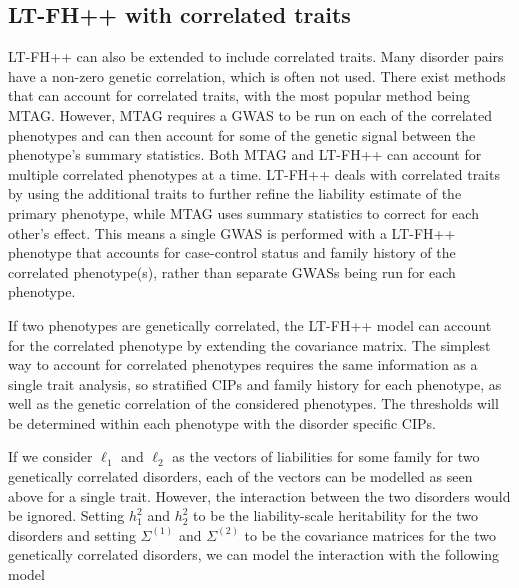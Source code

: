 \subsection{LT-FH++ with correlated traits} \label{sec:methods:ltfhpp:correlatedTraits}
LT-FH++ can also be extended to include correlated traits. Many disorder pairs have a non-zero genetic correlation, which is often not used. There exist methods that can account for correlated traits, with the most popular method being MTAG\cite{turley2018multi}. However, MTAG requires a GWAS to be run on each of the correlated phenotypes and can then account for some of the genetic signal between the phenotype's summary statistics. Both MTAG and LT-FH++ can account for multiple correlated phenotypes at a time. LT-FH++ deals with correlated traits by using the additional traits to further refine the liability estimate of the primary phenotype, while MTAG uses summary statistics to correct for each other's effect. This means a single GWAS is performed with a LT-FH++ phenotype that accounts for case-control status and family history of the correlated phenotype(s), rather than separate GWASs being run for each phenotype. 

If two phenotypes are genetically correlated, the LT-FH++ model can account for the correlated phenotype by extending the covariance matrix. The simplest way to account for correlated phenotypes requires the same information as a single trait analysis, so stratified CIPs and family history for each phenotype, as well as the genetic correlation of the considered phenotypes. The thresholds will be determined within each phenotype with the disorder specific CIPs.

If we consider $ \ell_1 $ and $ \ell_2 $ as the vectors of liabilities for some family for two genetically correlated disorders, each of the vectors can be modelled as seen above for a single trait. However, the interaction between the two disorders would be ignored. Setting $ h_1^2 $ and $ h_2^2 $ to be the liability-scale heritability for the two disorders and setting $ \Sigma^{(1)} $ and $ \Sigma^{(2)} $ to be the covariance matrices for the two genetically correlated disorders, we can model the interaction with the following model

